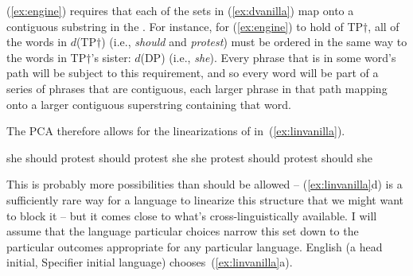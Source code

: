 \documentclass[output=paper]{langsci/langscibook}
\begin{document}
(\ref{ex:engine}) requires that each of the sets in (\ref{ex:dvanilla}) map onto a contiguous substring in the . For instance, for (\ref{ex:engine}) to hold of TP$\dag$, all of the words in $d$(TP$\dag$) (i.e., \emph{should} and \emph{protest}) must be ordered in the same way to the words in TP$\dag$'s sister: $d$(DP) (i.e., \emph{she}). Every phrase that is in some word's path will be subject to this requirement, and so every word will be part of a series of phrases that are contiguous, each larger phrase in that path mapping onto a larger contiguous superstring containing that word.

The \gls{PCA} therefore allows for the linearizations of  in~(\ref{ex:linvanilla}).
\begin{exe}
	\ex \label{ex:linvanilla}
	\begin{xlist}
		\ex she should protest
		\ex should protest she
		\ex she protest should
		\ex protest should she
	\end{xlist}
\end{exe}

This is probably more possibilities than should be allowed -- (\ref{ex:linvanilla}d) is a sufficiently rare way for a language to linearize this structure that we might want to block it -- but it comes close to what's cross-linguistically available. I will assume that the language particular choices narrow this set down to the particular outcomes appropriate for any particular language. English (a head initial, Specifier initial language) chooses~(\ref{ex:linvanilla}a).
\end{document}
